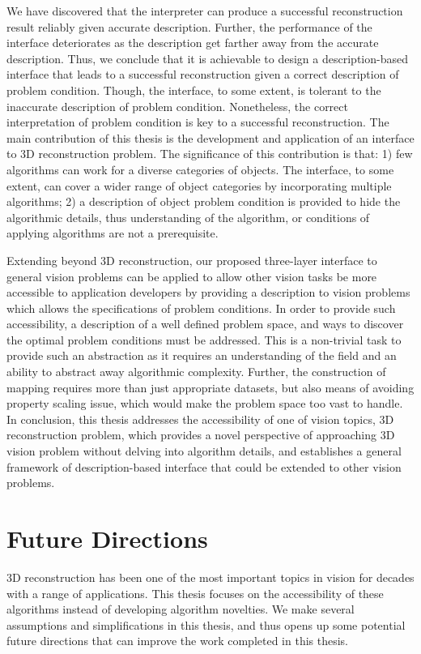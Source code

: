 We have discovered that the interpreter can produce a successful reconstruction result reliably given accurate description. Further, the performance of the interface deteriorates as the description get farther away from the accurate description. Thus, we conclude that it is achievable to design a description-based interface that leads to a successful reconstruction given a correct description of problem condition. Though, the interface, to some extent, is tolerant to the inaccurate description of problem condition. Nonetheless, the correct interpretation of problem condition is key to a successful reconstruction. The main contribution of this thesis is the development and application of an interface to 3D reconstruction problem. The significance of this contribution is that: 1) few algorithms can work for a diverse categories of objects. The interface, to some extent, can cover a wider range of object categories by incorporating multiple algorithms; 2) a description of object problem condition is provided to hide the algorithmic details, thus understanding of the algorithm, or conditions of applying algorithms are not a prerequisite.

Extending beyond 3D reconstruction, our proposed three-layer interface to general vision problems can be applied to allow other vision tasks be more accessible to application developers by providing a description to vision problems which allows the specifications of problem conditions. In order to provide such accessibility, a description of a well defined problem space, and ways to discover the optimal problem conditions must be addressed. This is a non-trivial task to provide such an abstraction as it requires an understanding of the field and an ability to abstract away algorithmic complexity. Further, the construction of mapping requires more than just appropriate datasets, but also means of avoiding property scaling issue, which would make the problem space too vast to handle. In conclusion, this thesis addresses the accessibility of one of vision topics, 3D reconstruction problem, which provides a novel perspective of approaching 3D vision problem without delving into algorithm details, and establishes a general framework of description-based interface that could be extended to other vision problems.

\section{Future Directions}
3D reconstruction has been one of the most important topics in vision for decades with a range of applications. This thesis focuses on the accessibility of these algorithms instead of developing algorithm novelties. We make several assumptions and simplifications in this thesis, and thus opens up some potential future directions that can improve the work completed in this thesis.

